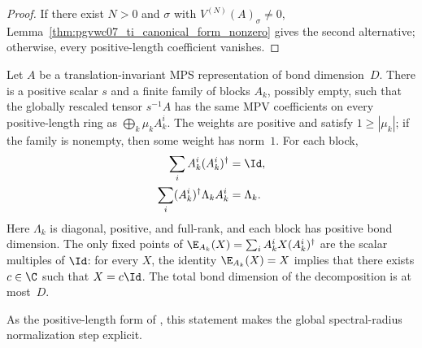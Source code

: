 \begin{proof}\leanok
    If there exist $N>0$ and $\sigma$ with $V^{(N)}(A)_\sigma\neq0$,
    Lemma~\ref{thm:pgvwc07_ti_canonical_form_nonzero} gives the second
    alternative; otherwise, every positive-length coefficient vanishes.
\end{proof}

\begin{theorem}%
    \label{thm:pgvwc07_ti_canonical_form}
    \leanok
    Let $A$ be a translation-invariant MPS representation of bond
    dimension~$D$. There is a positive scalar $s$ and a finite family of
    blocks $A_k$, possibly empty, such that the globally rescaled tensor
    $s^{-1}A$ has the same MPV coefficients on every positive-length ring as
    $\bigoplus_k \mu_k A_k^i$.
    The weights are positive and satisfy $1\ge |\mu_k|$; if the family is
    nonempty, then some weight has norm~$1$. For each block,
    \begin{align}
        \sum_i A_k^i(A_k^i)^\dagger
         & = \Id,
        \notag          \\
        \sum_i (A_k^i)^\dagger \Lambda_k A_k^i
         & = \Lambda_k.
        \label{eq:canonical_pgvwc_block_conditions}
    \end{align}
    Here $\Lambda_k$ is diagonal, positive, and full-rank, and each block has
    positive bond dimension. The only fixed points of
    $\E_{A_k}(X)=\sum_i A_k^iX(A_k^i)^\dagger$ are the scalar multiples of
    $\Id$: for every $X$, the identity $\E_{A_k}(X)=X$ implies that there
    exists $c\in\C$ such that $X=c\Id$.
    The total bond dimension of the decomposition is at most~$D$.

    As the positive-length form of
    \cite[Theorem~4]{PerezGarcia2007Matrix}, this statement makes the global
    spectral-radius normalization step explicit.
\end{theorem}

